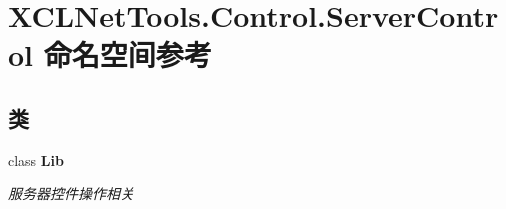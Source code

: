 \hypertarget{namespace_x_c_l_net_tools_1_1_control_1_1_server_control}{}\section{X\+C\+L\+Net\+Tools.\+Control.\+Server\+Control 命名空间参考}
\label{namespace_x_c_l_net_tools_1_1_control_1_1_server_control}
\subsection*{类}
\begin{DoxyCompactItemize}
\item 
class {\bfseries Lib}
\begin{DoxyCompactList}\small\item\em 服务器控件操作相关 \end{DoxyCompactList}\end{DoxyCompactItemize}
